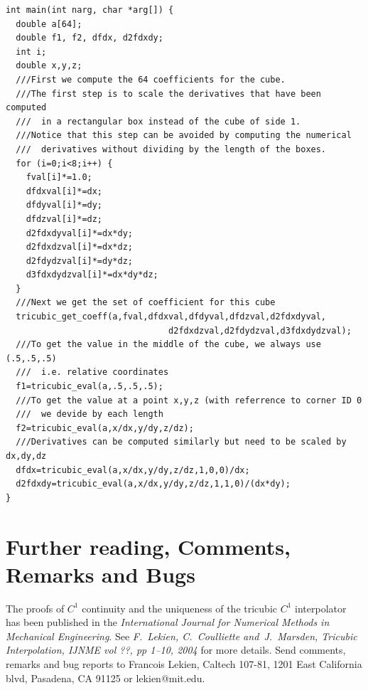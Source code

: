 \documentclass{article}
\begin{document}
\begin{verbatim}
int main(int narg, char *arg[]) {
  double a[64];
  double f1, f2, dfdx, d2fdxdy;
  int i;
  double x,y,z;
  ///First we compute the 64 coefficients for the cube.
  ///The first step is to scale the derivatives that have been computed
  ///  in a rectangular box instead of the cube of side 1.
  ///Notice that this step can be avoided by computing the numerical
  ///  derivatives without dividing by the length of the boxes.
  for (i=0;i<8;i++) {
    fval[i]*=1.0;
    dfdxval[i]*=dx;
    dfdyval[i]*=dy;
    dfdzval[i]*=dz;
    d2fdxdyval[i]*=dx*dy;
    d2fdxdzval[i]*=dx*dz;
    d2fdydzval[i]*=dy*dz;
    d3fdxdydzval[i]*=dx*dy*dz;
  } 
  ///Next we get the set of coefficient for this cube
  tricubic_get_coeff(a,fval,dfdxval,dfdyval,dfdzval,d2fdxdyval,
                                d2fdxdzval,d2fdydzval,d3fdxdydzval);
  ///To get the value in the middle of the cube, we always use (.5,.5,.5)
  ///  i.e. relative coordinates
  f1=tricubic_eval(a,.5,.5,.5);
  ///To get the value at a point x,y,z (with referrence to corner ID 0
  ///  we devide by each length
  f2=tricubic_eval(a,x/dx,y/dy,z/dz);
  ///Derivatives can be computed similarly but need to be scaled by dx,dy,dz
  dfdx=tricubic_eval(a,x/dx,y/dy,z/dz,1,0,0)/dx;
  d2fdxdy=tricubic_eval(a,x/dx,y/dy,z/dz,1,1,0)/(dx*dy);
}

\end{verbatim}

\section{Further reading, Comments, Remarks and Bugs}

The proofs of $C^1$ continuity and the uniqueness of the tricubic $C^1$ interpolator has been published in the {\em International Journal for Numerical Methods in Mechanical Engineering}. See {\em F.~Lekien, C.~Coulliette and~J.~Marsden, Tricubic Interpolation, IJNME vol ??, pp 1--10, 2004} for more details.
Send comments, remarks and bug reports to Francois Lekien, Caltech 107-81, 1201 East California blvd, Pasadena, CA 91125 or lekien@mit.edu.
\end{document}
